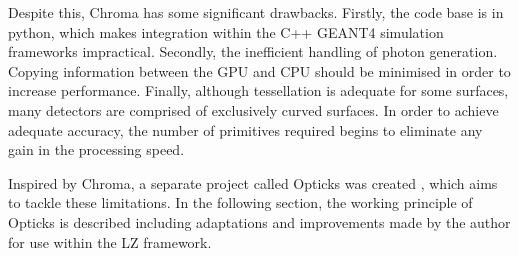\par
Despite this, Chroma has some significant drawbacks.
Firstly, the code base is in python, which makes integration within the C++ GEANT4 simulation frameworks impractical.
Secondly, the inefficient handling of photon generation.
Copying information between the GPU and CPU should be minimised in order to increase performance.
Finally, although tessellation is adequate for some surfaces, many detectors are comprised of exclusively curved surfaces.
In order to achieve adequate accuracy, the number of primitives required begins to eliminate any gain in the processing speed.
\par
Inspired by Chroma, a separate project called Opticks was created \cite{Opticks_Paper_2017_ref,Opticks_CHEP_2019_ref,Opticks_CHEP_2021_ref}, which aims to tackle these limitations.
In the following section, the working principle of Opticks is described including adaptations and improvements made by the author for use within the LZ framework.


